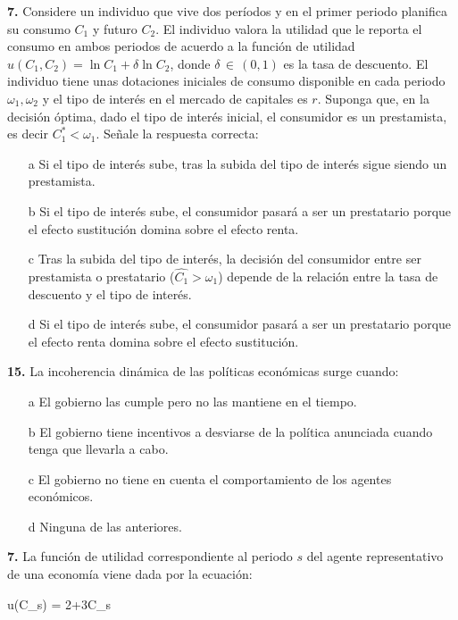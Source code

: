 \documentclass{nuevotema}
\begin{document}
\preguntas


\textbf{7.} Considere un individuo que vive dos períodos y en el primer periodo planifica su consumo $C_1$ y futuro $C_2$. El individuo valora la utilidad que le reporta el consumo en ambos periodos de acuerdo a la función de utilidad $u(C_1, C_2) = \ln C_1 + \delta \ln C_2$, donde $\delta \, \in \, (0,1)$ es la tasa de descuento. El individuo tiene unas dotaciones iniciales de consumo disponible en cada periodo $\omega_1, \omega_2$ y el tipo de interés en el mercado de capitales es $r$. Suponga que, en la decisión óptima, dado el tipo de interés inicial, el consumidor es un prestamista, es decir $C_1^* < \omega_1$. Señale la respuesta correcta:

\begin{itemize}
	\item[a] Si el tipo de interés sube, tras la subida del tipo de interés sigue siendo un prestamista.
	\item[b] Si el tipo de interés sube, el consumidor pasará a ser un prestatario porque el efecto sustitución domina sobre el efecto renta.
	\item[c] Tras la subida del tipo de interés, la decisión del consumidor entre ser prestamista o prestatario ($\hat{C_1} > \omega_1$) depende de la relación entre la tasa de descuento y el tipo de interés.
	\item[d] Si el tipo de interés sube, el consumidor pasará a ser un prestatario porque el efecto renta domina sobre el efecto sustitución.
\end{itemize}


\textbf{15.} La incoherencia dinámica de las políticas económicas surge cuando:

\begin{itemize}
	\item[a] El gobierno las cumple pero no las mantiene en el tiempo.
	\item[b] El gobierno tiene incentivos a desviarse de la política anunciada cuando tenga que llevarla a cabo.
	\item[c] El gobierno no tiene en cuenta el comportamiento de los agentes económicos.
	\item[d] Ninguna de las anteriores.
\end{itemize}

\textbf{7.} La función de utilidad correspondiente al periodo $s$ del agente representativo de una economía viene dada por la ecuación:
\begin{ecuacion}
	u(C_s) = 2+3C_s
\end{ecuacion}
\end{document}
